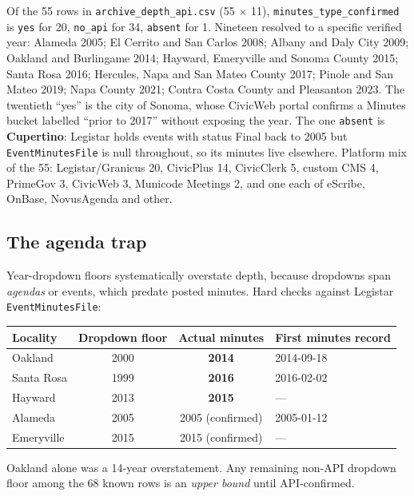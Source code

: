 \documentclass[11pt]{article}
\begin{document}
Of the 55 rows in \texttt{archive\_depth\_api.csv} (55 $\times$ 11),
\texttt{minutes\_type\_confirmed} is \texttt{yes} for 20, \texttt{no\_api} for 34,
\texttt{absent} for 1. Nineteen resolved to a specific verified year: Alameda 2005; El Cerrito
and San Carlos 2008; Albany and Daly City 2009; Oakland and Burlingame 2014; Hayward, Emeryville
and Sonoma County 2015; Santa Rosa 2016; Hercules, Napa and San Mateo County 2017; Pinole and San
Mateo 2019; Napa County 2021; Contra Costa County and Pleasanton 2023. The twentieth ``yes'' is
the city of Sonoma, whose CivicWeb portal confirms a Minutes bucket labelled ``prior to 2017''
without exposing the year. The one \texttt{absent} is \textbf{Cupertino}: Legistar holds events
with status Final back to 2005 but \texttt{EventMinutesFile} is null throughout, so its minutes
live elsewhere. Platform mix of the 55: Legistar/Granicus 20, CivicPlus 14, CivicClerk 5, custom
CMS 4, PrimeGov 3, CivicWeb 3, Municode Meetings 2, and one each of eScribe, OnBase, NovusAgenda
and other.

\subsection{The agenda trap}

Year-dropdown floors systematically overstate depth, because dropdowns span \emph{agendas} or
events, which predate posted minutes. Hard checks against Legistar \texttt{EventMinutesFile}:

\begin{center}
\begin{tabular}{lccl}
\toprule
\textbf{Locality} & \textbf{Dropdown floor} & \textbf{Actual minutes} & \textbf{First minutes record} \\
\midrule
Oakland    & 2000 & \textbf{2014} & 2014-09-18 \\
Santa Rosa & 1999 & \textbf{2016} & 2016-02-02 \\
Hayward    & 2013 & \textbf{2015} & --- \\
Alameda    & 2005 & 2005 (confirmed) & 2005-01-12 \\
Emeryville & 2015 & 2015 (confirmed) & --- \\
\bottomrule
\end{tabular}
\end{center}

Oakland alone was a 14-year overstatement. Any remaining non-API dropdown floor among the 68
known rows is an \emph{upper bound} until API-confirmed.
\end{document}
